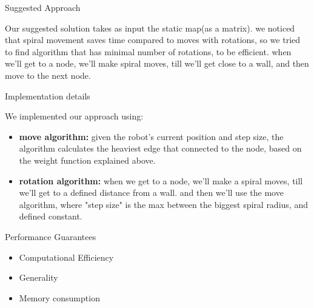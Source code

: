 \documentclass[10pt]{beamer}
\begin{document}
\begin{frame}{Suggested Approach}

Our suggested solution takes as input the static map(as a matrix). we noticed that spiral movement saves time compared to moves with rotations, so we tried to find algorithm that has minimal number of rotations, to be efficient. when we'll get to a node, we'll make spiral moves, till we'll get close to a wall, and then move to the next node.
\end{frame}



 \begin{frame}{Implementation details}

 We implemented our approach using:
  \begin{itemize}
     \item \textbf{move algorithm:}
     given the robot's current position and step size, the algorithm calculates the heaviest edge that connected to the node, based on the weight function explained above. 
\end{itemize}


    \begin{itemize}
         \item  \textbf{rotation algorithm:}
         when we get to a node, we'll make a spiral moves, till we'll get to a defined distance from a wall. and then we'll use the move algorithm, where "step size" is the max between the biggest spiral radius, and defined constant.  
    \end{itemize}
\end{frame}


\begin{frame}{Performance Guarantees}

\begin{itemize}
		\item Computational Efficiency 
		\item Generality
		\item Memory consumption
	\end{itemize}
	

\end{frame}
\end{document}
